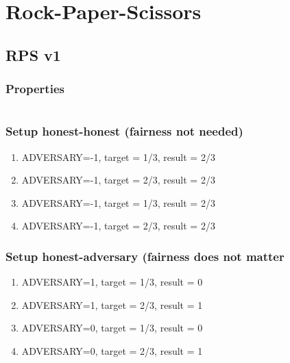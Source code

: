 \documentclass{article}
\begin{document}
\javastyle

\tableofcontents

\section{Rock-Paper-Scissors}

\subsection{RPS v1}



\subsubsection{Properties}

\begin{equation}
\text{}
\label{prop:rps_v1}
\end{equation}

\subsubsection{Setup honest-honest (fairness not needed)}

\begin{enumerate}
\item ADVERSARY=-1, target = 1/3, result = 2/3
\item ADVERSARY=-1, target = 2/3, result = 2/3
\item ADVERSARY=-1, target = 1/3, result = 2/3
\item ADVERSARY=-1, target = 2/3, result = 2/3
\end{enumerate}

\subsubsection{Setup honest-adversary (fairness does not matter}

\begin{enumerate}
\item ADVERSARY=1, target = 1/3, result = 0
\item ADVERSARY=1, target = 2/3, result = 1
\item ADVERSARY=0, target = 1/3, result = 0
\item ADVERSARY=0, target = 2/3, result = 1
\end{enumerate}
\end{document}
